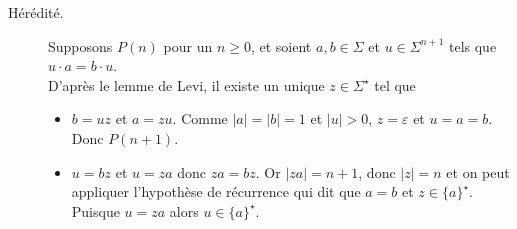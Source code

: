 \begin{corrections}
\begin{questions}
\begin{description}
    \item[Hérédité.] Supposons $P(n)$ pour un $n \ge 0$, et soient $a, b \in \Sigma$ et $u \in \Sigma^{n+1}$ tels que $u\cdot a = b\cdot u$.\\
      D'après le lemme de Levi, il existe un unique $z \in \Sigma^\star$ tel que 
      \begin{itemize}
      \item $b = uz$ et $a = zu$. Comme $|a| = |b| = 1$ et $|u| > 0$, $z = \varepsilon$ et $u = a = b$. Donc $P(n+1)$. 
      \item $u = bz$ et $u = za$ donc $za = bz$. Or $|za| = n+1$, donc $|z| = n$
        et on peut appliquer l'hypothèse
        de récurrence qui dit que $a = b$ et $z \in \{a\}^\star$. Puisque $u = za$ alors $u \in \{a\}^\star$.
      \end{itemize}
    \end{description}
  \end{questions}

\end{corrections}

\endgroup
\endinput
